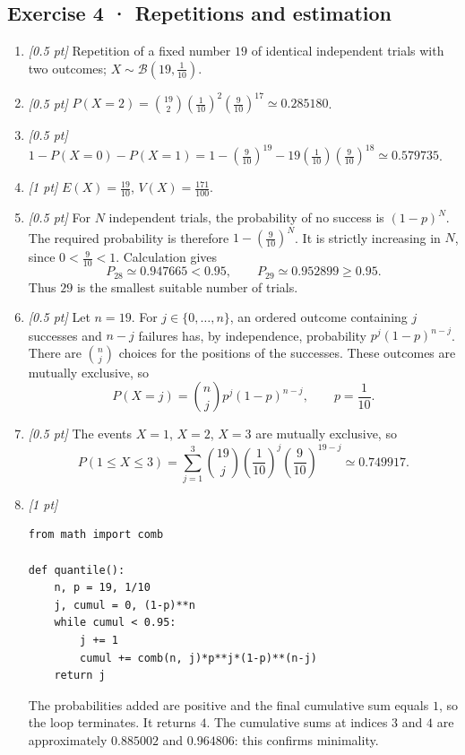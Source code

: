 \subsection*{Exercise 4 · Repetitions and estimation}\begin{enumerate}

\item \textit{[0.5 pt]} Repetition of a fixed number $19$ of identical independent trials with two outcomes; $X\sim\mathcal B(19,\frac{1}{10})$.

\item \textit{[0.5 pt]} $P(X=2)=\binom{19}2(\frac{1}{10})^2(\frac{9}{10})^{17}\simeq0.285180$.

\item \textit{[0.5 pt]} $1-P(X=0)-P(X=1)=1-(\frac{9}{10})^{19}-19(\frac{1}{10})(\frac{9}{10})^{18}\simeq0.579735$.

\item \textit{[1 pt]} $E(X)=\frac{19}{10}$, $V(X)=\frac{171}{100}$.

\item \textit{[0.5 pt]} For $N$ independent trials, the probability of no success is $(1-p)^N$. The required probability is therefore $1-(\frac{9}{10})^N$. It is strictly increasing in $N$, since $0<\frac{9}{10}<1$. Calculation gives
\[P_{28}\simeq0.947665<0.95,\qquad P_{29}\simeq0.952899\ge0.95.\]
Thus $29$ is the smallest suitable number of trials.

\item \textit{[0.5 pt]} Let $n=19$. For $j\in\{0,\ldots,n\}$, an ordered outcome containing $j$ successes and $n-j$ failures has, by independence, probability $p^j(1-p)^{n-j}$. There are $\binom nj$ choices for the positions of the successes. These outcomes are mutually exclusive, so
\[P(X=j)=\binom nj p^j(1-p)^{n-j},\qquad p=\frac{1}{10}.\]

\item \textit{[0.5 pt]} The events $X=1$, $X=2$, $X=3$ are mutually exclusive, so
\[P(1\le X\le3)=\sum_{j=1}^3\binom{19}j(\frac{1}{10})^j(\frac{9}{10})^{19-j}\simeq0.749917.\]


\item \textit{[1 pt]} 
\begin{lstlisting}
from math import comb

def quantile():
    n, p = 19, 1/10
    j, cumul = 0, (1-p)**n
    while cumul < 0.95:
        j += 1
        cumul += comb(n, j)*p**j*(1-p)**(n-j)
    return j
\end{lstlisting}
The probabilities added are positive and the final cumulative sum equals $1$, so the loop terminates. It returns $4$. The cumulative sums at indices $3$ and $4$ are approximately $0.885002$ and $0.964806$: this confirms minimality.

\end{enumerate}

\fi

\fi

